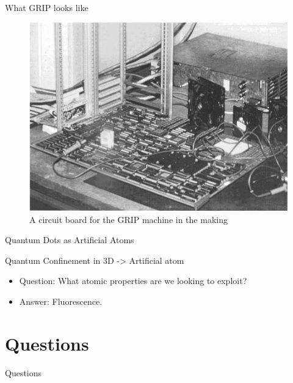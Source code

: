 \documentclass{beamer}
\begin{document}
\begin{frame}[fragile]{What GRIP looks like}{}

\begin{figure}[h]
 \centering
 \includegraphics[scale=.4]{figures/GRIP.png}
 \caption{A circuit board for the GRIP machine in the making \cite{PFPAnIntro}}
\end{figure}
\end{frame}


\begin{frame}{Quantum Dots as Artificial Atoms}{}

  Quantum Confinement in 3D -> Artificial atom
  \begin{itemize}
  \item
   Question: What atomic properties are we looking to exploit?
   \pause
  \item
    Answer: Fluorescence.
  \end{itemize}
\end{frame}


\section*{Questions}

\begin{frame}
\centering
Questions
\end{frame}

\end{document}
